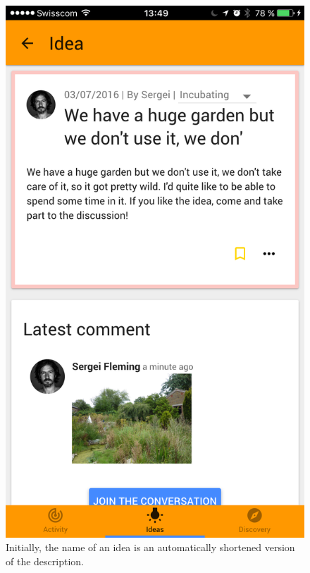 \documentclass[a4paper,12pt,twoside]{article}
\begin{document}
\begin{figure}[!htb]
    \begin{minipage}[t]{.32\textwidth}
        \centering
        \includegraphics[width=\textwidth]{images/flow_updateIdeaName_1.png}
        \caption{Initially, the name of an idea is an automatically shortened version of the description.}
    \end{minipage}
    \hfill
    \begin{minipage}[t]{.32\textwidth}
        \centering

\end{minipage}
\end{figure}
\end{document}

